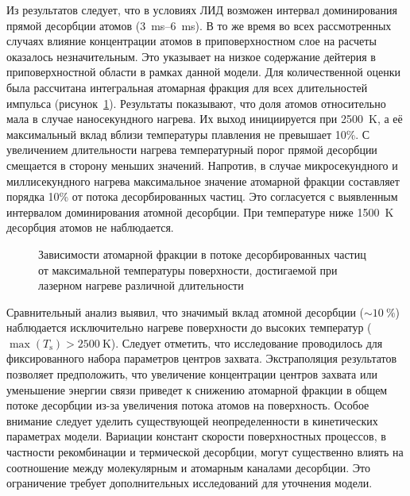 Из результатов следует, что в условиях ЛИД возможен интервал доминирования прямой десорбции атомов (\SIrange{3}{6}{\milli\second}). В то же время во всех рассмотренных случаях влияние концентрации атомов в приповерхностном слое на расчеты оказалось незначительным. Это указывает на низкое содержание дейтерия в приповерхностной области в рамках данной модели. Для количественной оценки была рассчитана интегральная атомарная фракция для всех длительностей импульса (рисунок~\cref{fig:ch4/LID_atomic_fraction}). Результаты показывают, что доля атомов относительно мала в случае наносекундного нагрева. Их выход инициируется при \SI{2500}{\kelvin}, а её максимальный вклад вблизи температуры плавления не превышает 10\%. С увеличением длительности нагрева температурный порог прямой десорбции смещается в сторону меньших значений. Напротив, в случае микросекундного и миллисекундного нагрева максимальное значение атомарной фракции составляет порядка 10\% от потока десорбированных частиц. Это согласуется с выявленным интервалом доминирования атомной десорбции. При температуре ниже \SI{1500}{\kelvin} десорбция атомов не наблюдается.

\begin{figure}[ht]
    \caption{Зависимости атомарной фракции в потоке десорбированных частиц от максимальной температуры поверхности, достигаемой при лазерном нагреве различной длительности}\label{fig:ch4/LID_atomic_fraction}
\end{figure}

Сравнительный анализ выявил, что значимый вклад атомной десорбции ($\sim\SI{10}{\percent}$) наблюдается исключительно нагреве поверхности до высоких температур ($\max(T_\mathrm{s})>\SI{2500}{\kelvin}$). Следует отметить, что исследование проводилось для фиксированного набора параметров центров захвата. Экстраполяция результатов позволяет предположить, что увеличение концентрации центров захвата или уменьшение энергии связи приведет к снижению атомарной фракции в общем потоке десорбции из-за увеличения потока атомов на поверхность. Особое внимание следует уделить существующей неопределенности в кинетических параметрах модели. Вариации констант скорости поверхностных процессов, в частности рекомбинации и термической десорбции, могут существенно влиять на соотношение между молекулярным и атомарным каналами десорбции. Это ограничение требует дополнительных исследований для уточнения модели.

